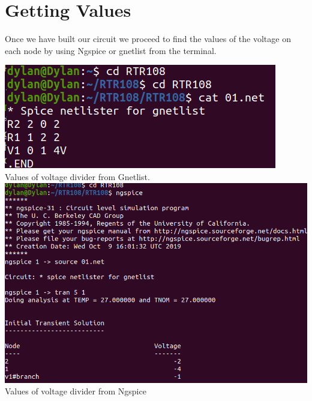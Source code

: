 \documentclass{article}
\begin{document}
\section{Getting Values}
Once we have built our circuit we proceed to find the values of the voltage on each node by using Ngspice or gnetlist from the terminal.
\begin{center}
    \includegraphics[width=.98\textwidth]{gnetlist.png}\\
    Values of voltage divider from Gnetlist.\\
    \includegraphics[width=.99\textwidth]{Ngspice.png}\\
    Values of voltage divider from Ngspice
\end{center}
\end{document}
